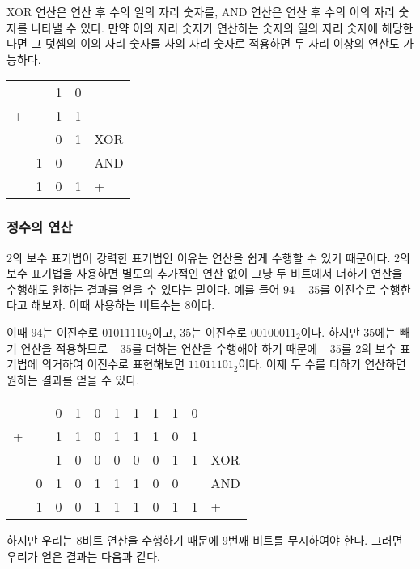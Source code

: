 \documentclass{article}
\begin{document}
XOR 연산은 연산 후 수의 일의 자리 숫자를, AND 연산은 연산 후 수의 이의 자리 숫자를 나타낼 수
있다. 만약 이의 자리 숫자가 연산하는 숫자의 일의 자리 숫자에 해당한다면 그 덧셈의 이의 자리
숫자를 사의 자리 숫자로 적용하면 두 자리 이상의 연산도 가능하다.

\begin{center}
    \begin{tabular}{ccccl}
          &   & 1 & 0 & \\
        + &   & 1 & 1 & \\
        \hline
          &   & 0 & 1 & XOR \\
          & 1 & 0 &   & AND \\
        \hline
          & 1 & 0 & 1 & +
    \end{tabular}
\end{center}

\subsubsection{정수의 연산}

2의 보수 표기법이 강력한 표기법인 이유는 연산을 쉽게 수행할 수 있기 때문이다.
2의 보수 표기법을 사용하면 별도의 추가적인 연산 없이 그냥 두 비트에서 더하기 연산을 수행해도
원하는 결과를 얻을 수 있다는 말이다. 예를 들어 $94 - 35$를 이진수로
수행한다고 해보자. 이때 사용하는 비트수는 8이다.

이때 $94$는 이진수로 $01011110_2$이고, $35$는 이진수로 $00100011_2$이다.
하지만 35에는 빼기 연산을 적용하므로 $-35$를 더하는 연산을 수행해야 하기 때문에
$-35$를 2의 보수 표기법에 의거하여 이진수로 표현해보면 $11011101_2$이다.
이제 두 수를 더하기 연산하면 원하는 결과를 얻을 수 있다.

\begin{center}
    \begin{tabular}{ccccccccccl}
          &   & 0 & 1 & 0 & 1 & 1 & 1 & 1 & 0 & \\
        + &   & 1 & 1 & 0 & 1 & 1 & 1 & 0 & 1 & \\
        \hline
          &   & 1 & 0 & 0 & 0 & 0 & 0 & 1 & 1 & XOR \\
          & 0 & 1 & 0 & 1 & 1 & 1 & 0 & 0 &   & AND \\
        \hline
          & 1 & 0 & 0 & 1 & 1 & 1 & 0 & 1 & 1 & +
    \end{tabular}
\end{center}

하지만 우리는 8비트 연산을 수행하기 때문에 9번째 비트를 무시하여야 한다.
그러면 우리가 얻은 결과는 다음과 같다.
\end{document}
